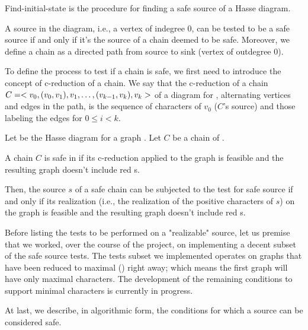 Find-initial-state is the procedure for finding a safe source of a Hasse diagram.

A source in the diagram, i.e., a vertex of indegree 0, can be tested to be a safe source if and only if it's the source of a chain deemed to be safe. Moreover, we define a chain as a directed path from source to sink (vertex of outdegree 0).

To define the process to test if a chain is safe, we first need to introduce the concept of c-reduction of a chain. We say that the c-reduction of a chain $C = < v_{0}, (v_{0}, v_{1}), v_{1}, \dots, (v_{k-1}, v_{k}), v_{k} >$ of a diagram \hasse{} for \gm{}, alternating vertices and edges in the path, is the sequence of characters of $v_{0}$ ($C$'s source) and those labeling the edges  for $0 \leq i < k$.

\begin{definition}\label{definition:safe-chain}
  Let \hasse{} be the Hasse diagram for a graph \gm{}.
  Let $C$ be a chain of \hasse{}.

  A chain $C$ is safe in \hasse{} if its c-reduction applied to the graph \gm{} is feasible and the resulting graph doesn't include red \sg{}s.
\end{definition}

Then, the source $s$ of a safe chain can be subjected to the test for safe source if and only if its realization (i.e., the realization of the positive characters of $s$) on the graph \grb{} is feasible and the resulting graph doesn't include red \sg{}s.

Before listing the tests to be performed on a "realizable" source, let us premise that we worked, over the course of the project, on implementing a decent subset of the safe source tests.
The tests subset we implemented operates on graphs that have been reduced to maximal (\grbcm{}) right away; which means the first graph \grb[0] will have only maximal characters.
The development of the remaining conditions to support minimal characters is currently in progress.

At last, we describe, in algorithmic form, the conditions for which a source can be considered safe.

